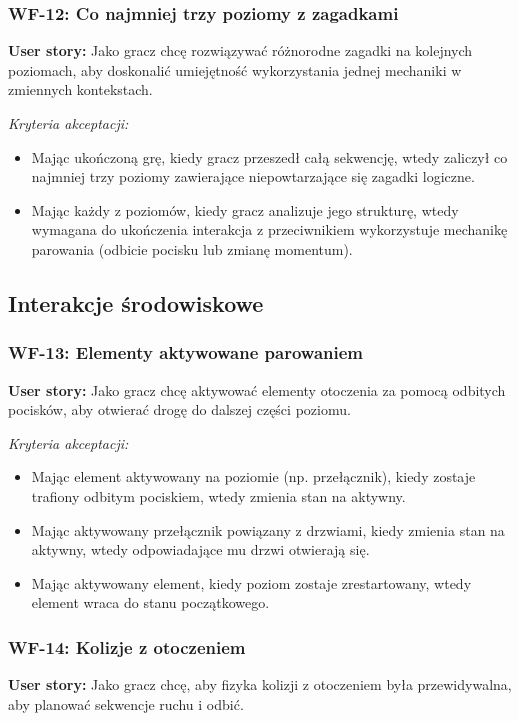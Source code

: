 \subsubsection*{WF-12: Co najmniej trzy poziomy z zagadkami}
\textbf{User story:} Jako gracz chcę rozwiązywać różnorodne zagadki na kolejnych poziomach, aby doskonalić umiejętność wykorzystania jednej mechaniki w zmiennych kontekstach.

\textit{Kryteria akceptacji:}
\begin{itemize}[noitemsep]
    \item Mając ukończoną grę, kiedy gracz przeszedł całą sekwencję, wtedy zaliczył co najmniej trzy poziomy zawierające niepowtarzające się zagadki logiczne.
    \item Mając każdy z poziomów, kiedy gracz analizuje jego strukturę, wtedy wymagana do ukończenia interakcja z przeciwnikiem wykorzystuje mechanikę parowania (odbicie pocisku lub zmianę momentum).
\end{itemize}

\subsection{Interakcje środowiskowe}

\subsubsection*{WF-13: Elementy aktywowane parowaniem}
\textbf{User story:} Jako gracz chcę aktywować elementy otoczenia za pomocą odbitych pocisków, aby otwierać drogę do dalszej części poziomu.

\textit{Kryteria akceptacji:}
\begin{itemize}[noitemsep]
    \item Mając element aktywowany na poziomie (np. przełącznik), kiedy zostaje trafiony odbitym pociskiem, wtedy zmienia stan na aktywny.
    \item Mając aktywowany przełącznik powiązany z drzwiami, kiedy zmienia stan na aktywny, wtedy odpowiadające mu drzwi otwierają się.
    \item Mając aktywowany element, kiedy poziom zostaje zrestartowany, wtedy element wraca do stanu początkowego.
\end{itemize}

\subsubsection*{WF-14: Kolizje z otoczeniem}
\textbf{User story:} Jako gracz chcę, aby fizyka kolizji z otoczeniem była przewidywalna, aby planować sekwencje ruchu i odbić.

